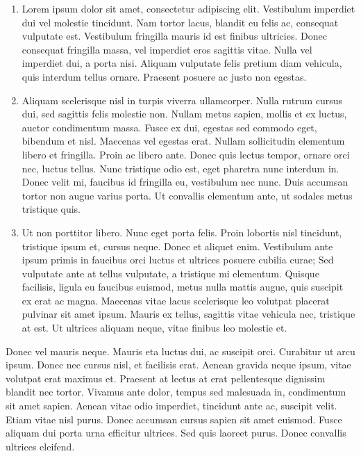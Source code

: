 \documentclass[DoubleHeader, Abgabe]{../abgaben}
\begin{document}
		
	
	\begin{enumerate}
		\item  Lorem ipsum dolor sit amet, consectetur adipiscing elit. Vestibulum imperdiet dui vel molestie tincidunt. Nam tortor lacus, blandit eu felis ac, consequat vulputate est. Vestibulum fringilla mauris id est finibus ultricies. Donec consequat fringilla massa, vel imperdiet eros sagittis vitae. Nulla vel imperdiet dui, a porta nisi. Aliquam vulputate felis pretium diam vehicula, quis interdum tellus ornare. Praesent posuere ac justo non egestas. 
		\item  Aliquam scelerisque nisl in turpis viverra ullamcorper. Nulla rutrum cursus dui, sed sagittis felis molestie non. Nullam metus sapien, mollis et ex luctus, auctor condimentum massa. Fusce ex dui, egestas sed commodo eget, bibendum et nisl. Maecenas vel egestas erat. Nullam sollicitudin elementum libero et fringilla. Proin ac libero ante. Donec quis lectus tempor, ornare orci nec, luctus tellus. Nunc tristique odio est, eget pharetra nunc interdum in. Donec velit mi, faucibus id fringilla eu, vestibulum nec nunc. Duis accumsan tortor non augue varius porta. Ut convallis elementum ante, ut sodales metus tristique quis. 
		\item  Ut non porttitor libero. Nunc eget porta felis. Proin lobortis nisl tincidunt, tristique ipsum et, cursus neque. Donec et aliquet enim. Vestibulum ante ipsum primis in faucibus orci luctus et ultrices posuere cubilia curae; Sed vulputate ante at tellus vulputate, a tristique mi elementum. Quisque facilisis, ligula eu faucibus euismod, metus nulla mattis augue, quis suscipit ex erat ac magna. Maecenas vitae lacus scelerisque leo volutpat placerat pulvinar sit amet ipsum. Mauris ex tellus, sagittis vitae vehicula nec, tristique at est. Ut ultrices aliquam neque, vitae finibus leo molestie et. 
	\end{enumerate}
	Donec vel mauris neque. Mauris eta luctus dui, ac suscipit orci. Curabitur ut arcu ipsum. Donec nec cursus nisl, et facilisis erat. Aenean gravida neque ipsum, vitae volutpat erat maximus et. Praesent at lectus at erat pellentesque dignissim blandit nec tortor. Vivamus ante dolor, tempus sed malesuada in, condimentum sit amet sapien. Aenean vitae odio imperdiet, tincidunt ante ac, suscipit velit. Etiam vitae nisl purus. Donec accumsan cursus sapien sit amet euismod. Fusce aliquam dui porta urna efficitur ultrices. Sed quis laoreet purus. Donec convallis ultrices eleifend. 	
\end{document}
